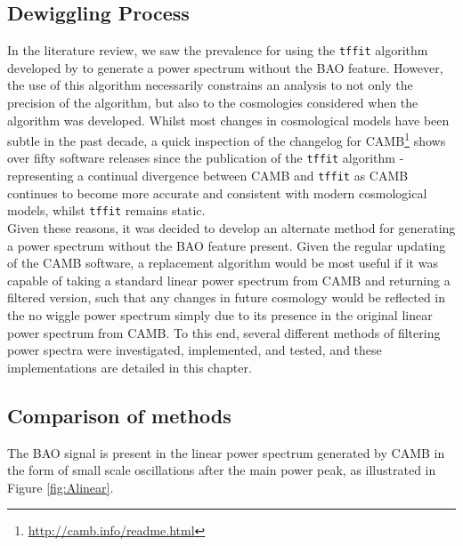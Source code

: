 \documentclass[titlesmallcaps, examinerscopy, copyrightpage]{uqthesis}
\begin{document}
\begin{appendices}


\chapter{Dewiggling Process}

In the literature review, we saw the prevalence for using the \verb;tffit; algorithm developed by \citet{EisensteinHu1998} to generate a power spectrum without the BAO feature. However, the use of this algorithm necessarily constrains an analysis to not only the precision of the algorithm, but also to the cosmologies considered when the algorithm was developed. Whilst most changes in cosmological models have been subtle in the past decade, a quick inspection of the changelog for CAMB\footnote{\url{http://camb.info/readme.html}} \citep{Lewis2000} shows over fifty software releases since the publication of the \verb;tffit; algorithm - representing a continual divergence between CAMB and \verb;tffit; as CAMB continues to become more accurate and consistent with modern cosmological models, whilst \verb;tffit; remains static. \\

Given these reasons, it was decided to develop an alternate method for generating a power spectrum without the BAO feature present. Given the regular updating of the CAMB software, a replacement algorithm would be most useful if it was capable of taking a standard linear power spectrum from CAMB and returning a filtered version, such that any changes in future cosmology would be reflected in the no wiggle power spectrum simply due to its presence in the original linear power spectrum from CAMB. To this end, several different methods of filtering power spectra were investigated, implemented, and tested, and these implementations are detailed in this chapter.

\section{Comparison of methods}

The BAO signal is present in the linear power spectrum generated by CAMB in the form of small scale oscillations after the main power peak, as illustrated in Figure \ref{fig:Alinear}.


\end{appendices}
\end{document}
